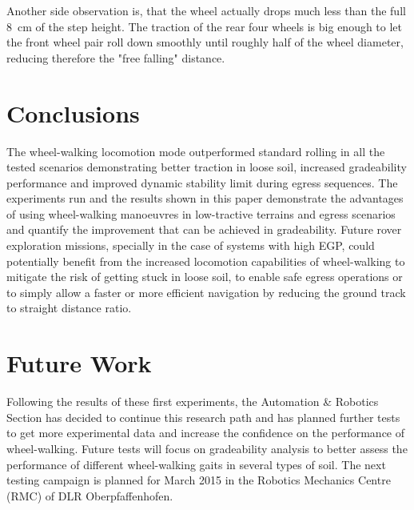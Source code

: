 \documentclass[a4paper,twocolumn]{esapub2005} %
\begin{document}
Another side observation is, that the wheel actually drops much less than the
full 8~\unit{cm} of the step height. The traction of the rear four wheels is big enough to
let the front wheel pair roll down smoothly until roughly half of the wheel
diameter, reducing therefore the "free falling" distance.


\section{Conclusions}
The wheel-walking locomotion mode outperformed standard rolling in all the
tested scenarios demonstrating better traction in loose soil, increased
gradeability performance and improved dynamic stability limit during egress sequences. The experiments run and the results shown in this paper demonstrate the advantages of using wheel-walking manoeuvres in low-tractive terrains and egress scenarios and quantify the improvement that can be achieved in gradeability.
Future rover exploration missions, specially in the case of systems with high EGP, could potentially benefit from the increased locomotion capabilities of wheel-walking to mitigate the risk of getting stuck in loose soil, to enable safe egress operations or to simply allow a faster or more efficient navigation by reducing the ground track to straight distance ratio.

\section{Future Work}
Following the results of these first experiments, the Automation \& Robotics Section has decided to
continue this research path and has planned further tests to get more
experimental data and increase the confidence on the performance of wheel-walking.  Future tests will focus on gradeability analysis to better assess the
performance of different wheel-walking gaits in several types of soil.  The
next testing campaign is planned for March 2015 in the Robotics Mechanics
Centre (RMC) of DLR Oberpfaffenhofen.


\vspace{-3 mm}




\end{document}
